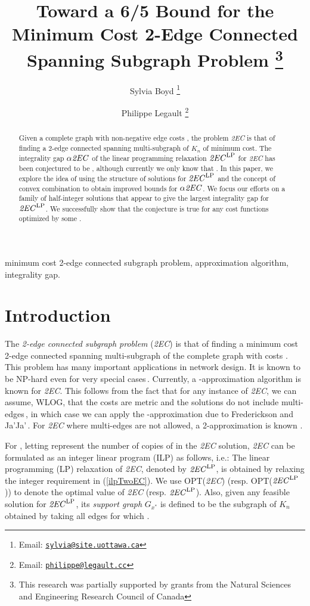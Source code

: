 \documentclass[oneeqnum,final]{siamltex1213}
\title{Toward a 6/5 Bound for the Minimum Cost 2-Edge Connected Spanning Subgraph Problem \thanks{This research was partially supported by grants from the Natural Sciences and \mbox{Engineering} Research Council of Canada}}
\author{Sylvia Boyd \thanks{Email: \href{mailto:sylvia@site.uottawa.ca}   
   {\texttt{sylvia@site.uottawa.ca}}}
\and Philippe Legault \thanks{Email: \href{mailto:philippe@legault.cc}  
   {\texttt{philippe@legault.cc}}}}
\newcommand{\TwoEC}{\emph{2EC}}
\newcommand{\TwoECLP}{\ensuremath{\text{\TwoEC}^{\text{LP}}}}
\newcommand{\alphaTwoEC}{\ensuremath{\alpha\text{\TwoEC}}}
\newcommand{\Kn}{\ensuremath{K_{n}}}
\newcommand{\Gx}{\ensuremath{G_{x^{*}}}}
\begin{document}
\maketitle

\begin{abstract}
Given a complete graph  with non-negative edge costs , the problem \TwoEC{} is that of finding a 2-edge connected spanning multi-subgraph of \Kn{} of minimum cost. The integrality gap \alphaTwoEC{} of the linear programming relaxation \TwoECLP{} for \TwoEC{} has been conjectured to be , although currently we only know that . In this paper, we explore the idea of using the structure of solutions for \TwoECLP{} and the concept of convex combination to obtain improved bounds for \alphaTwoEC. We focus our efforts on a family  of half-integer solutions that appear to give the largest integrality gap for \TwoECLP. We successfully show that the conjecture  is true for any cost functions optimized by some .
\end{abstract}

\begin{keywords}
minimum cost 2-edge connected subgraph problem, approximation algorithm, integrality gap.
\end{keywords}

\section{Introduction}
The \emph{2-edge connected subgraph problem} (\TwoEC{}) is that of finding a minimum cost 2-edge connected spanning multi-subgraph of the complete graph \sloppy{} with costs . This problem has many important applications in network design. It is known to be NP-hard even for very special cases\,\cite{csaba}. Currently, a -approximation algorithm is known for \TwoEC{}. This follows from the fact that for any instance of \TwoEC{}, we can assume, WLOG, that the costs are metric and the solutions do not include multi-edges\,\cite{alexander}, in which case we can apply the -approximation due to Frederickson and Ja'Ja'\,\cite{frederickson}. For \TwoEC{} where multi-edges are not allowed, a 2-approximation is known \cite{jain}.

For , letting  represent the number of copies of  in the \TwoEC{} solution, \TwoEC{} can be formulated as an integer linear program (ILP) as follows, i.e.:
\noindent The linear programming (LP) relaxation of \TwoEC{}, denoted by \TwoECLP, is obtained by relaxing the integer requirement in (\ref{ilpTwoEC}). We use OPT(\TwoEC{}) (resp. OPT(\TwoECLP)) to denote the optimal value of \TwoEC{} (resp. \TwoECLP). Also, given any feasible solution  for \TwoECLP, its \emph{support graph} \Gx{} is defined to be the subgraph of \Kn{} obtained by taking all edges  for which .
\end{document}
